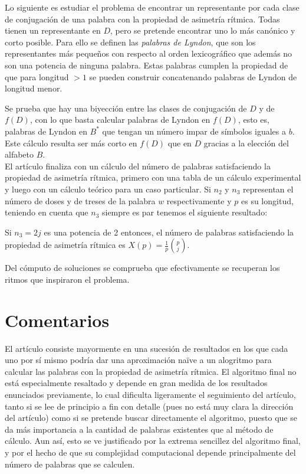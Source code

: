 \documentclass[twoside]{article}
\begin{document}
Lo siguiente es estudiar el problema de encontrar un representante por cada clase de conjugación de una palabra con la propiedad de asimetría rítmica. Todas tienen un representante en $D$, pero se pretende encontrar uno lo más canónico y corto posible. Para ello se definen las \emph{palabras de Lyndon}, que son los representantes más pequeños con respecto al orden lexicográfico que además no son una potencia de ninguna palabra. Estas palabras cumplen la propiedad de que para longitud $>1$ se pueden construir concatenando palabras de Lyndon de longitud menor. 

Se prueba que hay una biyección entre las clases de conjugación de $D$ y de $f(D)$, con lo que basta calcular palabras de Lyndon en $f(D)$, esto es, palabras de Lyndon en $B^*$ que tengan un número impar de símbolos iguales a $b$. Este cálculo resulta ser más corto en $f(D)$ que en $D$ gracias a la elección del alfabeto $B$. \\


El artículo finaliza con un cálculo del número de palabras satisfaciendo la propiedad de asimetría rítmica, primero con una tabla de un cálculo experimental y luego con un cálculo teórico para un caso particular. Si $n_2$ y $n_3$ representan el número de doses y de treses de la palabra $w$ respectivamente y $p$ es su longitud, teniendo en cuenta que $n_3$ siempre es par tenemos el siguiente resultado:

\begin{prop}
Si $n_3=2j$ es una potencia de 2 entonces, el número de palabras satisfaciendo la propiedad de asimetría rítmica es $X(p)=\frac{1}{p}\binom{p}{j}$. 
\end{prop}

Del cómputo de soluciones se comprueba que efectivamente se recuperan los ritmos que inspiraron el problema. 

\section{Comentarios}

El artículo consiste mayormente en una sucesión de resultados en los que cada uno por sí mismo podría dar una aproximación naïve a un alogritmo para calcular las palabras con la propiedad de asimetría rítmica. El algoritmo final no está especialmente resaltado y depende en gran medida de los resultados enunciados previamente, lo cual dificulta ligeramente el seguimiento del artículo, tanto si se lee de principio a fin con detalle (pues no está muy clara la dirección del artículo) como si se pretende buscar directamente el algoritmo, puesto que se da más importancia a la cantidad de palabras existentes que al método de cálculo. Aun así, esto se ve justificado por la extrema sencillez del algoritmo final, y por el hecho de que su complejidad computacional depende principalmente del número de palabras que se calculen. 
\end{document}
